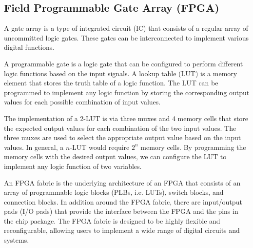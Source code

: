 \documentclass[11pt]{report}
\begin{document}
\subsection{Field Programmable Gate Array (FPGA)}
\begin{definition}
    A gate array is a type of integrated circuit (IC) that consists of a regular array of uncommitted logic gates. These gates can be interconnected to implement various digital functions. 
\end{definition}

\begin{definition}
    A programmable gate is a logic gate that can be configured to perform different logic functions based on the input signals. A lookup table (LUT) is a memory element that stores the truth table of a logic function. The LUT can be programmed to implement any logic function by storing the corresponding output values for each possible combination of input values. 

    The implementation of a 2-LUT is via three muxes and 4 memory cells that store the expected output values for each combination of the two input values. The three muxes are used to select the appropriate output value based on the input values. In general, a $n$-LUT would require $2^n$ memory cells. By programming the memory cells with the desired output values, we can configure the LUT to implement any logic function of two variables.
\end{definition}

\begin{definition}
    An FPGA fabric is the underlying architecture of an FPGA that consists of an array of programmable logic blocks (PLBs, i.e. LUTs), switch blocks, and connection blocks. In addition around the FPGA fabric, there are input/output pads (I/O pads) that provide the interface between the FPGA and the pins in the chip package. The FPGA fabric is designed to be highly flexible and reconfigurable, allowing users to implement a wide range of digital circuits and systems.

\end{definition}
\end{document}
